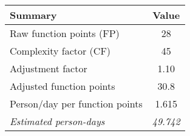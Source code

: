 \begin{tabular}{l|c}
\textbf{Summary} & \textbf{Value} \\ \hline
Raw function points (FP) & 28 \\
Complexity factor (CF) & 45 \\
Adjustment factor & 1.10 \\
Adjusted function points & 30.8 \\
Person/day per function points & 1.615 \\ \hline
\textit{Estimated person-days} & \textit{49.742}
\end{tabular}
